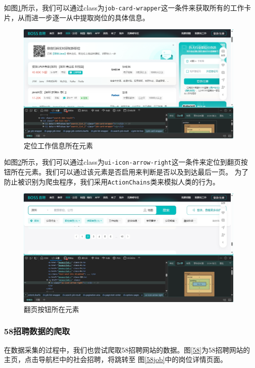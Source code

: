 如图\ref{wrapper}所示，我们可以通过class为\texttt{job-card-wrapper}这一条件来获取所有的工作卡片，从而进一步逐一从中提取岗位的具体信息。


\begin{figure}[!htbp]
    \centering
    \includegraphics[width=\textwidth]{figures/wrapper.png}
    \caption{定位工作信息所在元素}\label{wrapper}
\end{figure}

如图\ref{next}所示，我们可以通过class为\texttt{ui-icon-arrow-right}这一条件来定位到翻页按钮所在元素。我们可以通过该元素是否启用来判断是否以及到达最后一页。
为了防止被识别为爬虫程序，我们采用\verb|ActionChains|类来模拟人类的行为。

\begin{figure}[!htbp]
    \centering
    \includegraphics[width=\textwidth]{figures/next.png}
    \caption{翻页按钮所在元素}\label{next}
\end{figure}

\subsubsection{58招聘数据的爬取}

在数据采集的过程中，我们也尝试爬取58招聘网站的数据。图\ref{58}为58招聘网站的主页，点击导航栏中的社会招聘，将跳转至
图\ref{58job}中的岗位详情页面。

